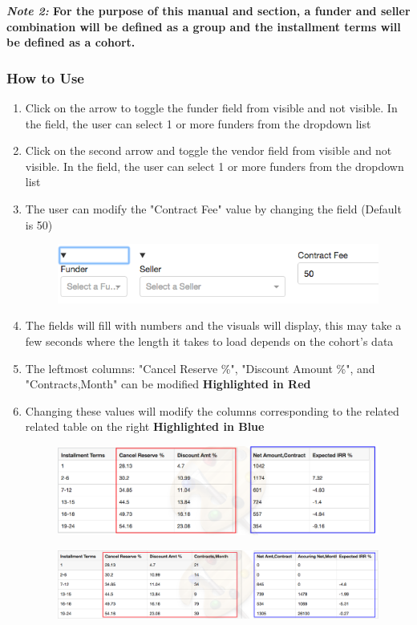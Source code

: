 \documentclass[titlepage]{article}
\begin{document}
\textbf{\emph{Note 2:} For the purpose of this manual and section, a funder and seller combination will be defined as a group and the installment terms will be defined as a cohort.}
\subsubsection{How to Use}
\begin{enumerate}
	\item Click on the arrow to toggle the funder field from visible and not visible. In the field, the user can select 1 or more funders from the dropdown list
	\item Click on the second arrow and toggle the vendor field from visible and not visible. In the field, the user can select 1 or more funders from the dropdown list
	\item The user can modify the "Contract Fee" value by changing the field (Default is 50)
	\begin{figure}[h]
		\includegraphics[width=\linewidth]{./pics/scenario_modeling_toggle.png}
	\end{figure}
	\item The fields will fill with numbers and the visuals will display, this may take a few seconds where the length it takes to load depends on the cohort's data 
	\item The leftmost columns: "Cancel Reserve \%", "Discount Amount \%", and "Contracts,Month" can be modified \textbf{Highlighted in Red}
	\item Changing these values will modify the columns corresponding to the related related table on the right \textbf{Highlighted in Blue}
	\begin{figure}[h]
		\includegraphics[width=\linewidth]{./pics/scenario_modeling_admin_firstTable.png}
	\end{figure}
	\begin{figure}[h]
		\includegraphics[width=\linewidth]{./pics/scenario_modeling_admin_secTable.png}
	\end{figure}
\end{enumerate}
\newpage
\end{document}

